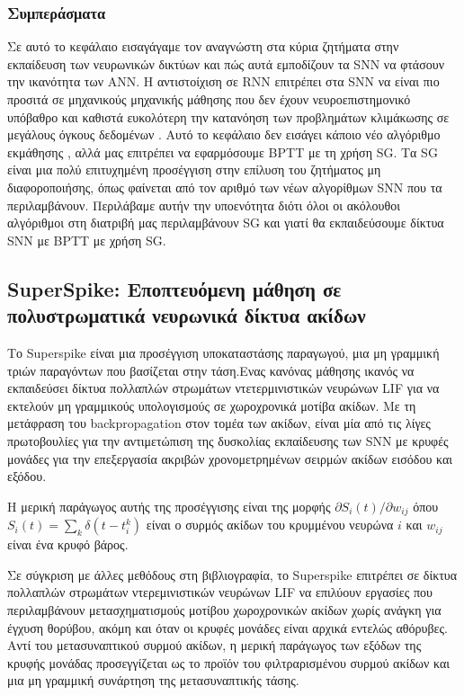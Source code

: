\documentclass[12pt]{report}
\begin{document}
\subsubsection{Συμπεράσματα}
Σε αυτό το κεφάλαιο εισαγάγαμε τον αναγνώστη στα κύρια ζητήματα στην εκπαίδευση των νευρωνικών δικτύων και πώς αυτά εμποδίζουν τα \textlatin{SNN} να φτάσουν την ικανότητα των ANN. Η αντιστοίχιση σε \textlatin{RNN} επιτρέπει στα \textlatin{SNN} να είναι πιο προσιτά σε μηχανικούς μηχανικής μάθησης που δεν έχουν νευροεπιστημονικό υπόβαθρο και καθιστά ευκολότερη την κατανόηση των προβλημάτων κλιμάκωσης σε μεγάλους όγκους δεδομένων . Αυτό το κεφάλαιο δεν εισάγει κάποιο νέο αλγόριθμο εκμάθησης , αλλά μας επιτρέπει να εφαρμόσουμε \textlatin{BPTT} με τη χρήση \textlatin{SG}. Τα \textlatin{SG} είναι μια πολύ επιτυχημένη προσέγγιση στην επίλυση του ζητήματος μη διαφοροποιήσης, όπως φαίνεται από τον αριθμό των νέων αλγορίθμων SNN που τα περιλαμβάνουν. Περιλάβαμε αυτήν την υποενότητα διότι όλοι οι ακόλουθοι αλγόριθμοι στη διατριβή μας περιλαμβάνουν \textlatin{SG} και γιατί θα εκπαιδεύσουμε δίκτυα \textlatin{SNN} με \textlatin{BPTT} με χρήση \textlatin{SG}.

\subsection{\textlatin{SuperSpike}: Εποπτευόμενη μάθηση σε πολυστρωματικά νευρωνικά δίκτυα ακίδων}
Το \textlatin{Superspike} είναι μια προσέγγιση υποκαταστάσης παραγωγού, μια μη γραμμική τριών παραγόντων που βασίζεται στην τάση.Ενας κανόνας μάθησης ικανός να εκπαιδεύσει δίκτυα πολλαπλών στρωμάτων ντετερμινιστικών νευρώνων \textlatin{LIF} για να εκτελούν μη γραμμικούς υπολογισμούς σε χωροχρονικά μοτίβα ακίδων. Με τη μετάφραση του \textlatin{backpropagation} στον τομέα των ακίδων, είναι μία από τις λίγες πρωτοβουλίες για την αντιμετώπιση της δυσκολίας εκπαίδευσης των \textlatin{SNN }με κρυφές μονάδες για την επεξεργασία ακριβών χρονομετρημένων σειρμών ακίδων εισόδου και εξόδου.

Η μερική παράγωγος αυτής της προσέγγισης είναι της μορφής $\partial S_{i}(t) / \partial w_{i j}$ όπου $S_{i}(t)=\sum_{k} \delta\left(t-t_{i}^{k}\right)$ είναι ο συρμός ακίδων του κρυμμένου νευρώνα $i$ και $w_{i j}$ είναι ένα κρυφό βάρος.

Σε σύγκριση με άλλες μεθόδους στη βιβλιογραφία, το \textlatin{Superspike} επιτρέπει σε δίκτυα πολλαπλών στρωμάτων ντερεμινιστικών νευρώνων \textlatin{LIF} να επιλύουν εργασίες που περιλαμβάνουν μετασχηματισμούς μοτίβου χωροχρονικών ακίδων χωρίς ανάγκη για έγχυση θορύβου, ακόμη και όταν οι κρυφές μονάδες είναι αρχικά εντελώς αθόρυβες. Αντί του μετασυναπτικού συρμού ακίδων, η μερική παράγωγος των εξόδων της κρυφής μονάδας προσεγγίζεται ως το προϊόν του φιλτραρισμένου συρμού ακίδων και μια μη γραμμική συνάρτηση της μετασυναπτικής τάσης.
\end{document}

